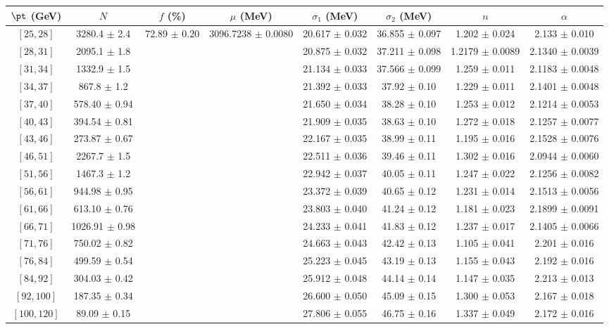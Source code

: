 \begin{tabular}{c||c|c|c|c|c|c|c}
$\pt$ (GeV) & $N$ & $f$ (\%) & $\mu$ (MeV) & $\sigma_1$ (MeV) & $\sigma_2$ (MeV) & $n$ & $\alpha$ \\
\hline
$[25, 28]$ & 3280.4 $\pm$ 2.4 & \multirow{17}{*}{72.89 $\pm$ 0.20} & \multirow{17}{*}{3096.7238 $\pm$ 0.0080} & 20.617 $\pm$ 0.032 & 36.855 $\pm$ 0.097 & 1.202 $\pm$ 0.024 & 2.133 $\pm$ 0.010\\
$[28, 31]$ & 2095.1 $\pm$ 1.8 &  &  & 20.875 $\pm$ 0.032 & 37.211 $\pm$ 0.098 & 1.2179 $\pm$ 0.0089 & 2.1340 $\pm$ 0.0039\\
$[31, 34]$ & 1332.9 $\pm$ 1.5 &  &  & 21.134 $\pm$ 0.033 & 37.566 $\pm$ 0.099 & 1.259 $\pm$ 0.011 & 2.1183 $\pm$ 0.0048\\
$[34, 37]$ & 867.8 $\pm$ 1.2 &  &  & 21.392 $\pm$ 0.033 & 37.92 $\pm$ 0.10 & 1.229 $\pm$ 0.011 & 2.1401 $\pm$ 0.0048\\
$[37, 40]$ & 578.40 $\pm$ 0.94 &  &  & 21.650 $\pm$ 0.034 & 38.28 $\pm$ 0.10 & 1.253 $\pm$ 0.012 & 2.1214 $\pm$ 0.0053\\
$[40, 43]$ & 394.54 $\pm$ 0.81 &  &  & 21.909 $\pm$ 0.035 & 38.63 $\pm$ 0.10 & 1.272 $\pm$ 0.018 & 2.1257 $\pm$ 0.0077\\
$[43, 46]$ & 273.87 $\pm$ 0.67 &  &  & 22.167 $\pm$ 0.035 & 38.99 $\pm$ 0.11 & 1.195 $\pm$ 0.016 & 2.1528 $\pm$ 0.0076\\
$[46, 51]$ & 2267.7 $\pm$ 1.5 &  &  & 22.511 $\pm$ 0.036 & 39.46 $\pm$ 0.11 & 1.302 $\pm$ 0.016 & 2.0944 $\pm$ 0.0060\\
$[51, 56]$ & 1467.3 $\pm$ 1.2 &  &  & 22.942 $\pm$ 0.037 & 40.05 $\pm$ 0.11 & 1.247 $\pm$ 0.022 & 2.1256 $\pm$ 0.0082\\
$[56, 61]$ & 944.98 $\pm$ 0.95 &  &  & 23.372 $\pm$ 0.039 & 40.65 $\pm$ 0.12 & 1.231 $\pm$ 0.014 & 2.1513 $\pm$ 0.0056\\
$[61, 66]$ & 613.10 $\pm$ 0.76 &  &  & 23.803 $\pm$ 0.040 & 41.24 $\pm$ 0.12 & 1.181 $\pm$ 0.023 & 2.1899 $\pm$ 0.0091\\
$[66, 71]$ & 1026.91 $\pm$ 0.98 &  &  & 24.233 $\pm$ 0.041 & 41.83 $\pm$ 0.12 & 1.237 $\pm$ 0.017 & 2.1405 $\pm$ 0.0066\\
$[71, 76]$ & 750.02 $\pm$ 0.82 &  &  & 24.663 $\pm$ 0.043 & 42.42 $\pm$ 0.13 & 1.105 $\pm$ 0.041 & 2.201 $\pm$ 0.016\\
$[76, 84]$ & 499.59 $\pm$ 0.54 &  &  & 25.223 $\pm$ 0.045 & 43.19 $\pm$ 0.13 & 1.155 $\pm$ 0.043 & 2.192 $\pm$ 0.016\\
$[84, 92]$ & 304.03 $\pm$ 0.42 &  &  & 25.912 $\pm$ 0.048 & 44.14 $\pm$ 0.14 & 1.147 $\pm$ 0.035 & 2.213 $\pm$ 0.013\\
$[92, 100]$ & 187.35 $\pm$ 0.34 &  &  & 26.600 $\pm$ 0.050 & 45.09 $\pm$ 0.15 & 1.300 $\pm$ 0.053 & 2.167 $\pm$ 0.018\\
$[100, 120]$ & 89.09 $\pm$ 0.15 &  &  & 27.806 $\pm$ 0.055 & 46.75 $\pm$ 0.16 & 1.337 $\pm$ 0.049 & 2.172 $\pm$ 0.016\\
\end{tabular}

